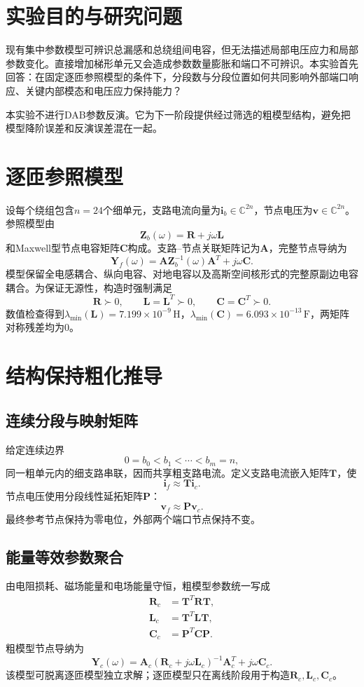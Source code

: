 \documentclass[UTF8,12pt,a4paper]{ctexart}
\begin{document}
\tableofcontents
\newpage

\section{实验目的与研究问题}
现有集中参数模型可辨识总漏感和总绕组间电容，但无法描述局部电压应力和局部参数变化。直接增加梯形单元又会造成参数数量膨胀和端口不可辨识。本实验首先回答：在固定逐匝参照模型的条件下，分段数与分段位置如何共同影响外部端口响应、关键内部模态和电压应力保持能力？

本实验不进行DAB参数反演。它为下一阶段提供经过筛选的粗模型结构，避免把模型降阶误差和反演误差混在一起。

\section{逐匝参照模型}
设每个绕组包含$n=24$个细单元，支路电流向量为$\bm i_b\in\mathbb C^{2n}$，节点电压为$\bm v\in\mathbb C^{2n}$。参照模型由
\[
\bm Z_b(\omega)=\bm R+j\omega\bm L
\]
和Maxwell型节点电容矩阵$\bm C$构成。支路--节点关联矩阵记为$\bm A$，完整节点导纳为
\begin{equation}
\bm Y_f(\omega)=\bm A\bm Z_b^{-1}(\omega)\bm A^T+j\omega\bm C.
\end{equation}
模型保留全电感耦合、纵向电容、对地电容以及高斯空间核形式的完整原副边电容耦合。为保证无源性，构造时强制满足
\[
\bm R\succ0,\qquad \bm L=\bm L^T\succ0,\qquad \bm C=\bm C^T\succ0.
\]
数值检查得到$\lambda_{\min}(\bm L)=7.199\times10^{-9}\,\mathrm H$，$\lambda_{\min}(\bm C)=6.093\times10^{-13}\,\mathrm F$，两矩阵对称残差均为0。

\section{结构保持粗化推导}
\subsection{连续分段与映射矩阵}
给定连续边界
\[
0=b_0<b_1<\cdots<b_m=n,
\]
同一粗单元内的细支路串联，因而共享粗支路电流。定义支路电流嵌入矩阵$\bm T$，使
\[
\bm i_f\approx\bm T\bm i_c.
\]
节点电压使用分段线性延拓矩阵$\bm P$：
\[
\bm v_f\approx\bm P\bm v_c.
\]
最终参考节点保持为零电位，外部两个端口节点保持不变。

\subsection{能量等效参数聚合}
由电阻损耗、磁场能量和电场能量守恒，粗模型参数统一写成
\begin{align}
\bm R_c&=\bm T^T\bm R\bm T,\\
\bm L_c&=\bm T^T\bm L\bm T,\\
\bm C_c&=\bm P^T\bm C\bm P.
\end{align}
粗模型节点导纳为
\begin{equation}
\bm Y_c(\omega)=\bm A_c(\bm R_c+j\omega\bm L_c)^{-1}\bm A_c^T+j\omega\bm C_c.
\end{equation}
该模型可脱离逐匝模型独立求解；逐匝模型只在离线阶段用于构造$\bm R_c,\bm L_c,\bm C_c$。
\end{document}
